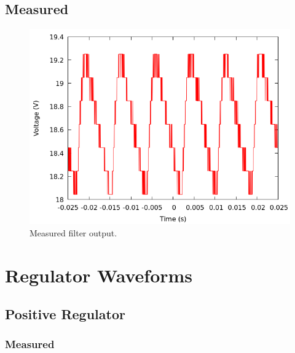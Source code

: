 \documentclass[12pt]{article}
\newcommand{\graphwidth}{0.5\linewidth}
\begin{document}
\begin{appendix}
\subsection{Measured}

\begin{figure}[H]
    \centering
    \includegraphics[width=\graphwidth]{./res/image/rectifier-withload.png}
    \caption{Measured filter output.}
    \label{fig:filtered}
\end{figure}

\section{Regulator Waveforms}

\subsection{Positive Regulator}

\subsubsection{Measured}


\end{appendix}
\end{document}

